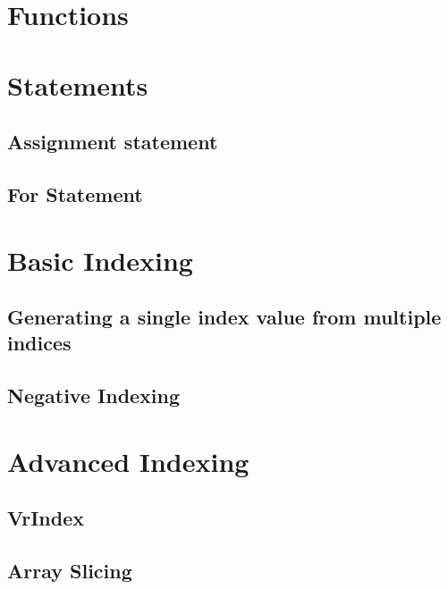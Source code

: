\section{Functions} 
\section{Statements}
\subsection{Assignment statement}
\subsection{For Statement}
\section{Basic Indexing}
\subsection{ Generating a single index value from multiple indices}
\subsection{Negative Indexing}
\section{Advanced Indexing}
\subsection{VrIndex}
\subsection{Array Slicing}
